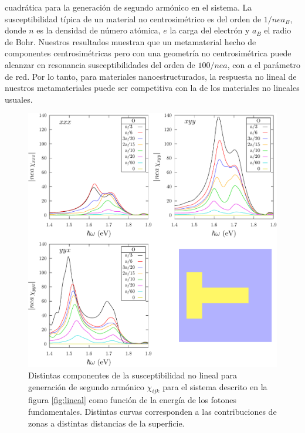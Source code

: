 \documentclass[12pt]{article}
\begin{document}
cuadrática para la generación de segundo armónico en el sistema. La
susceptibilidad típica de un material no centrosimétrico es del orden
de $1/nea_B$, donde $n$ es la densidad de número atómica, $e$ la carga
del electrón y $a_B$ el radio de Bohr. Nuestros resultados muestran
que un metamaterial hecho de componentes centrosimétricas pero con una
geometría no centrosimétrica puede alcanzar en resonancia
susceptibilidades del orden de $100/nea$, con $a$ el parámetro de
red. Por lo tanto, para materiales nanoestructurados, la respuesta no
lineal de nuestros metamateriales puede ser competitiva con la de los
materiales no lineales usuales.
\begin{figure}
  \centering
  \includegraphics[width=\textwidth]{fig20}
  \caption{Distintas componentes de la susceptibilidad no lineal para
    generación de segundo armónico $\chi_{ijk}$ para el sistema
    descrito en la figura \ref{fig:lineal} como función de la energía
    de los fotones fundamentales. Distintas curvas corresponden a las
    contribuciones de zonas a distintas distancias de la superficie.}
  \label{fig:xi2}
\end{figure}
\end{document}
